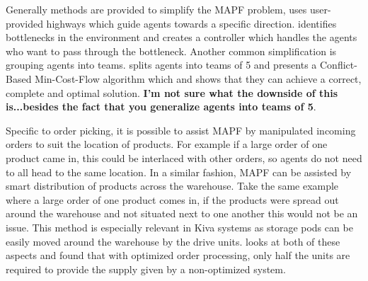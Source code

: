 \documentclass[a4paper,11pt]{article}
\begin{document}
Generally methods are provided to simplify the MAPF problem, \cite{cohen2016bounded} uses user-provided highways which guide agents towards a specific direction. \cite{wilt2014spatially} identifies bottlenecks in the environment and creates a controller which handles the agents who want to pass through the bottleneck. Another common simplification is grouping agents into teams. \cite{ma2016optimal} splits agents into teams of 5 and presents a Conflict-Based Min-Cost-Flow algorithm which and shows that they can achieve a correct, complete and optimal solution. \textbf{I'm not sure what the downside of this is...besides the fact that you generalize agents into teams of 5}.



Specific to order picking, it is possible to assist MAPF by manipulated incoming orders to suit the location of products. For example if a large order of one product came in, this could be interlaced with other orders, so agents do not need to all head to the same location. In a similar fashion, MAPF can be assisted by smart distribution of products across the warehouse. Take the same example where a large order of one product comes in, if the products were spread out around the warehouse and not situated next to one another this would not be an issue. This method is especially relevant in Kiva systems as storage pods can be easily moved around the warehouse by the drive units. \cite{boysen2017parts} looks at both of these aspects and found that with optimized order processing, only half the units are required to provide the supply given by a non-optimized system.





\end{document}
